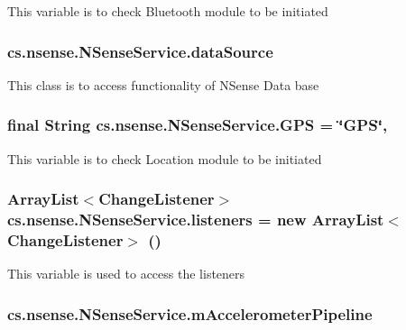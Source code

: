 This variable is to check Bluetooth module to be initiated \hypertarget{classcs_1_1nsense_1_1_n_sense_service_a754a38b7d533d212aadc065287f1684a}{
\subsubsection[{data\-Source}]{ cs.\-nsense.\-N\-Sense\-Service.\-data\-Source\hspace{0.3cm}{\ttfamily [private]}}}\label{classcs_1_1nsense_1_1_n_sense_service_a754a38b7d533d212aadc065287f1684a}
This class is to access functionality of N\-Sense Data base \hypertarget{classcs_1_1nsense_1_1_n_sense_service_a4970f4b5efb33f4c768e7c4606cb7d3b}{
\subsubsection[{G\-P\-S}]{\setlength{\rightskip}{0pt plus 5cm}final String cs.\-nsense.\-N\-Sense\-Service.\-G\-P\-S = \char`\"{}G\-P\-S\char`\"{}\hspace{0.3cm}{\ttfamily [static]}, {\ttfamily [private]}}}\label{classcs_1_1nsense_1_1_n_sense_service_a4970f4b5efb33f4c768e7c4606cb7d3b}
This variable is to check Location module to be initiated \hypertarget{classcs_1_1nsense_1_1_n_sense_service_add437e668afb02ec0fa1c2f20d6cc5df}{
\subsubsection[{listeners}]{\setlength{\rightskip}{0pt plus 5cm}Array\-List$<${\bf Change\-Listener}$>$ cs.\-nsense.\-N\-Sense\-Service.\-listeners = new Array\-List$<${\bf Change\-Listener}$>$ ()\hspace{0.3cm}{\ttfamily [private]}}}\label{classcs_1_1nsense_1_1_n_sense_service_add437e668afb02ec0fa1c2f20d6cc5df}
This variable is used to access the listeners \hypertarget{classcs_1_1nsense_1_1_n_sense_service_a3ce1d75779f97340739041615c544825}{
\subsubsection[{m\-Accelerometer\-Pipeline}]{ cs.\-nsense.\-N\-Sense\-Service.\-m\-Accelerometer\-Pipeline\hspace{0.3cm}{\ttfamily [private]}}}\label{classcs_1_1nsense_1_1_n_sense_service_a3ce1d75779f97340739041615c544825}
